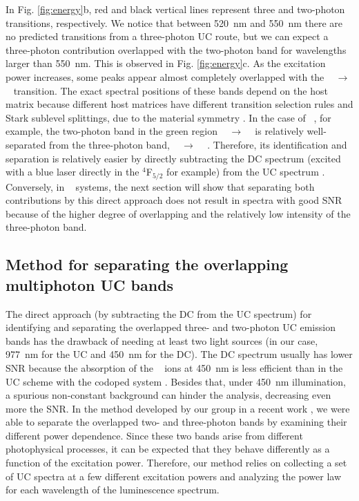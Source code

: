 \documentclass[journal=jacsat,manuscript=article, layout=twocolumn]{achemso}
\newcommand*\Yttria[1]{Y$_{2}$O$_{3}$}
\newcommand*\Fluorite[1]{NaYF$_{4}$}
\newcommand*\Er[1]{Er$^{3+}$}
\newcommand*\twoHnine[1]{$^2$H$_{9/2}$}
\newcommand*\fourFfive[1]{$^4$F$_{5/2}$}
\newcommand*\fourSthree[1]{$^4$S$_{3/2}$}
\newcommand*\fourIthirteen[1]{$^4$I$_{13/2}$}
\newcommand*\fourIfifteen[1]{$^4$I$_{15/2}$}
\begin{document}
In Fig. \ref{fig:energy}b, red and black vertical lines represent three and two-photon transitions, respectively. We notice that between \SI{520}{\nano\meter} and \SI{550}{\nano\meter} there are no predicted transitions from a three-photon UC route, but we can expect a three-photon contribution overlapped with the two-photon band for wavelengths larger than \SI{550}{\nano\meter}. This is observed in Fig. \ref{fig:energy}c. As the excitation power increases, some peaks appear almost completely overlapped with the \fourSthree~ $\rightarrow$ \fourIfifteen~ transition. The exact spectral positions of these bands depend on the host matrix because different host matrices have different transition selection rules and Stark sublevel splittings, due to the material symmetry \cite{Brik_2020}. In the case of \Fluorite~, for example, the two-photon band in the green region \fourSthree~ $\rightarrow$ \fourIfifteen~ is relatively well-separated from the three-photon band, \twoHnine~ $\rightarrow$ \fourIthirteen~ \cite{Goncalves_2021}. Therefore, its identification and separation is relatively easier by directly subtracting the DC spectrum (excited with a blue laser directly in the \fourFfive, for example) from the UC spectrum \cite{vanSwieten_2021, Ruhl_2021}. Conversely, in \Yttria~ systems, the next section will show that separating both contributions by this direct approach does not result in spectra with good SNR because of the higher degree of overlapping and the relatively low intensity of the three-photon band.

\subsection{Method for separating the overlapping multiphoton UC bands}{\label{subsec:separating}}

The direct approach (by subtracting the DC from the UC spectrum) for identifying and separating the overlapped three- and two-photon UC emission bands has the drawback of needing at least two light sources (in our case, \SI{977}{\nano\meter} for the UC and \SI{450}{\nano\meter} for the DC). The DC spectrum usually has lower SNR because the absorption of the \Er~ ions at \SI{450}{\nano\meter} is less efficient than in the UC scheme with the codoped system \cite{Huang_2015}. Besides that, under \SI{450}{\nano\meter} illumination, a spurious non-constant background can hinder the analysis, decreasing even more the SNR. In the method developed by our group in a recent work \cite{Galindo_2022}, we were able to separate the overlapped two- and three-photon bands by examining their different power dependence. Since these two bands arise from different photophysical processes, it can be expected that they behave differently as a function of the excitation power. Therefore, our method relies on collecting a set of UC spectra at a few different excitation powers and analyzing the power law for each wavelength of the luminescence spectrum.
\end{document}
